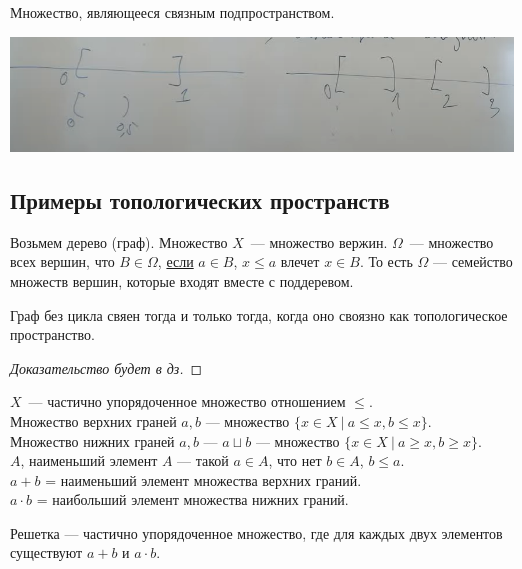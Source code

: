\begin{definition}

    Множество, являющееся связным подпространством.
\end{definition}

\begin{center}
    \includegraphics[scale=0.6]{img/topology_connectivy}
\end{center}

\subsection{Примеры топологических пространств}
Возьмем дерево (граф). Множество $X$~--- множество вержин. $\Omega$~--- множество всех вершин, что
$B \in \Omega$, \underline{если} $a \in B$, $x \leqslant a$ влечет $x \in B$. 
То есть $\Omega$ --- семейство множеств вершин, которые входят вместе с поддеревом.  

\begin{theorem}
    Граф без цикла свяен тогда и только тогда, когда оно своязно как топологическое пространство.
    \begin{proof}[Доказательство будет в дз]
    \end{proof}
\end{theorem}

\begin{definition}[Решетки]
    $X$~--- частично упорядоченное множество отношением $\leqslant$.\\
    Множество верхних граней $a, b$ --- множество $\{ x \in X ~|~ a \leqslant x, b \leqslant x\}$.\\
    Множество нижних граней $a, b$ --- $a \sqcup b$ --- множество $\{ x \in X ~|~ a \geqslant x, b \geqslant x\}$.\\
    $A$, наименьший элемент $A$ --- такой $a \in A$, что нет $b \in A$, $b \leqslant a$.\\
    $a+b$ = наименьший элемент множества верхних граний.\\
    $a \cdot b$ = наибольший элемент множества нижних граний.

    Решетка --- частично упорядоченное множество, где для каждых двух элементов существуют $a+b$ и $a \cdot b$.
\end{definition}

